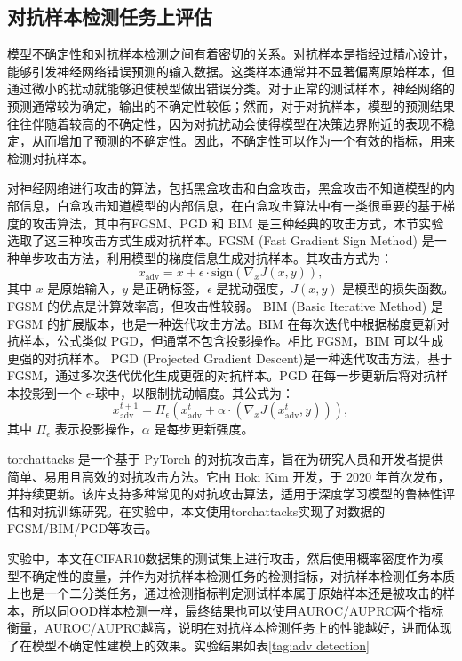 \subsection{对抗样本检测任务上评估}
模型不确定性和对抗样本检测之间有着密切的关系。对抗样本是指经过精心设计，能够引发神经网络错误预测的输入数据。这类样本通常并不显著偏离原始样本，但通过微小的扰动就能够迫使模型做出错误分类。对于正常的测试样本，神经网络的预测通常较为确定，输出的不确定性较低；然而，对于对抗样本，模型的预测结果往往伴随着较高的不确定性，因为对抗扰动会使得模型在决策边界附近的表现不稳定，从而增加了预测的不确定性。因此，不确定性可以作为一个有效的指标，用来检测对抗样本。

对神经网络进行攻击的算法，包括黑盒攻击和白盒攻击，黑盒攻击不知道模型的内部信息，白盒攻击知道模型的内部信息，在白盒攻击算法中有一类很重要的基于梯度的攻击算法，其中有FGSM、PGD 和 BIM 是三种经典的攻击方式，本节实验选取了这三种攻击方式生成对抗样本。FGSM (Fast Gradient Sign Method) 是一种单步攻击方法，利用模型的梯度信息生成对抗样本。其攻击方式为：
    \[
    x_{\text{adv}} = x + \epsilon \cdot \text{sign}(\nabla_x J(x, y)),
    \]
    其中 $x$ 是原始输入，$y$ 是正确标签，$\epsilon$ 是扰动强度，$J(x, y)$ 是模型的损失函数。FGSM 的优点是计算效率高，但攻击性较弱。   BIM (Basic Iterative Method) 是 FGSM 的扩展版本，也是一种迭代攻击方法。BIM 在每次迭代中根据梯度更新对抗样本，公式类似 PGD，但通常不包含投影操作。相比 FGSM，BIM 可以生成更强的对抗样本。
   PGD (Projected Gradient Descent)是一种迭代攻击方法，基于 FGSM，通过多次迭代优化生成更强的对抗样本。PGD 在每一步更新后将对抗样本投影到一个 $\epsilon$-球中，以限制扰动幅度。其公式为：
    \[
    x_{\text{adv}}^{t+1} = \Pi_{\epsilon}(x_{\text{adv}}^t + \alpha \cdot (\nabla_x J(x_{\text{adv}}^t, y))),
    \]
    其中 $\Pi_{\epsilon}$ 表示投影操作，$\alpha$ 是每步更新强度。

torchattacks\cite{kim2020torchattacks} 是一个基于 PyTorch 的对抗攻击库，旨在为研究人员和开发者提供简单、易用且高效的对抗攻击方法。它由 Hoki Kim 开发，于 2020 年首次发布，并持续更新。该库支持多种常见的对抗攻击算法，适用于深度学习模型的鲁棒性评估和对抗训练研究。在实验中，本文使用torchattacks实现了对数据的FGSM/BIM/PGD等攻击。

实验中，本文在CIFAR10数据集的测试集上进行攻击，然后使用概率密度作为模型不确定性的度量，并作为对抗样本检测任务的检测指标，对抗样本检测任务本质上也是一个二分类任务，通过检测指标判定测试样本属于原始样本还是被攻击的样本，所以同OOD样本检测一样，最终结果也可以使用AUROC/AUPRC两个指标衡量，AUROC/AUPRC越高，说明在对抗样本检测任务上的性能越好，进而体现了在模型不确定性建模上的效果。实验结果如表\ref{tag:adv detection}



